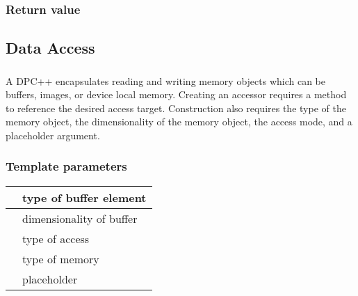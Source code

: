 \documentclass[letterpaper,10pt,english]{sphinxmanual}
\begin{document}
\subsubsection*{Return value}


\subsection{Data Access}
\label{\detokenize{programming-interface/data/index:data-access}}\label{\detokenize{programming-interface/data/index::doc}}

\subsubsection{}
\label{\detokenize{programming-interface/data/accessor:accessor}}\label{\detokenize{programming-interface/data/accessor::doc}}
\begin{sphinxVerbatim}[commandchars=\\\{\}]
     
     
     
       
       
 
\end{sphinxVerbatim}

A DPC++  encapsulates reading and writing memory objects
which can be buffers, images, or device local memory. Creating an
accessor requires a method to reference the desired access target.
Construction also requires the type of the memory object, the
dimensionality of the memory object, the access mode, and a placeholder
argument.
\subsubsection*{Template parameters}


\begin{savenotes}\sphinxattablestart
\centering
\begin{tabulary}{\linewidth}[t]{|T|T|}
\hline

&
type of buffer element
\\
\hline
{}
&
dimensionality of buffer
\\
\hline
{}
&
type of access
\\
\hline
{}
&
type of memory
\\
\hline
{}
&
placeholder
\\
\hline
\end{tabulary}
\par
\sphinxattableend\end{savenotes}
\end{document}
